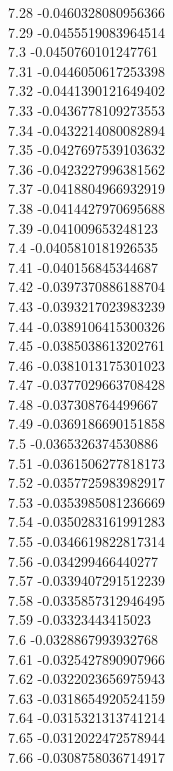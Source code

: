 {7.28	-0.0460328080956366\\
7.29	-0.0455519083964514\\
7.3	-0.0450760101247761\\
7.31	-0.0446050617253398\\
7.32	-0.0441390121649402\\
7.33	-0.0436778109273553\\
7.34	-0.0432214080082894\\
7.35	-0.0427697539103632\\
7.36	-0.0423227996381562\\
7.37	-0.0418804966932919\\
7.38	-0.0414427970695688\\
7.39	-0.041009653248123\\
7.4	-0.0405810181926535\\
7.41	-0.040156845344687\\
7.42	-0.0397370886188704\\
7.43	-0.0393217023983239\\
7.44	-0.0389106415300326\\
7.45	-0.0385038613202761\\
7.46	-0.0381013175301023\\
7.47	-0.0377029663708428\\
7.48	-0.037308764499667\\
7.49	-0.0369186690151858\\
7.5	-0.0365326374530886\\
7.51	-0.0361506277818173\\
7.52	-0.0357725983982917\\
7.53	-0.0353985081236669\\
7.54	-0.0350283161991283\\
7.55	-0.0346619822817314\\
7.56	-0.034299466440277\\
7.57	-0.0339407291512239\\
7.58	-0.0335857312946495\\
7.59	-0.03323443415023\\
7.6	-0.0328867993932768\\
7.61	-0.0325427890907966\\
7.62	-0.0322023656975943\\
7.63	-0.0318654920524159\\
7.64	-0.0315321313741214\\
7.65	-0.0312022472578944\\
7.66	-0.0308758036714917\\
}
